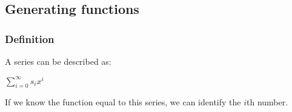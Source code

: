 \subsection{Generating functions}

\subsubsection{Definition}

A series can be described as:

\(\sum_{i=0}^{\infty }s_i x^i\)

If we know the function equal to this series, we can identify the \(i\)th number.

